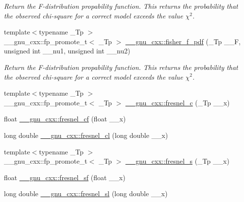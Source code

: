 \begin{DoxyCompactItemize}
\begin{DoxyCompactList}\small\item\em Return the F-\/distribution propability function. This returns the probability that the observed chi-\/square for a correct model exceeds the value $ \chi^2 $. \end{DoxyCompactList}\item 
{\footnotesize template$<$typename \+\_\+\+Tp $>$ }\\\+\_\+\+\_\+gnu\+\_\+cxx\+::fp\+\_\+promote\+\_\+t$<$ \+\_\+\+Tp $>$ \hyperlink{group__gnu__math__spec__func_gac4564fd8e265c000675e0f38d656a18a}{\+\_\+\+\_\+gnu\+\_\+cxx\+::fisher\+\_\+f\+\_\+pdf} (\+\_\+\+Tp \+\_\+\+\_\+F, unsigned int \+\_\+\+\_\+nu1, unsigned int \+\_\+\+\_\+nu2)
\begin{DoxyCompactList}\small\item\em Return the F-\/distribution propability function. This returns the probability that the observed chi-\/square for a correct model exceeds the value $ \chi^2 $. \end{DoxyCompactList}\item 
{\footnotesize template$<$typename \+\_\+\+Tp $>$ }\\\+\_\+\+\_\+gnu\+\_\+cxx\+::fp\+\_\+promote\+\_\+t$<$ \+\_\+\+Tp $>$ \hyperlink{group__gnu__math__spec__func_ga92a3585165bfad3f9972fb4210140d22}{\+\_\+\+\_\+gnu\+\_\+cxx\+::fresnel\+\_\+c} (\+\_\+\+Tp \+\_\+\+\_\+x)
\item 
float \hyperlink{group__gnu__math__spec__func_ga02ca7579d5aef96cba69e38e988e7a42}{\+\_\+\+\_\+gnu\+\_\+cxx\+::fresnel\+\_\+cf} (float \+\_\+\+\_\+x)
\item 
long double \hyperlink{group__gnu__math__spec__func_gaa3f82a7569d61c2f7c194d2e64b616f8}{\+\_\+\+\_\+gnu\+\_\+cxx\+::fresnel\+\_\+cl} (long double \+\_\+\+\_\+x)
\item 
{\footnotesize template$<$typename \+\_\+\+Tp $>$ }\\\+\_\+\+\_\+gnu\+\_\+cxx\+::fp\+\_\+promote\+\_\+t$<$ \+\_\+\+Tp $>$ \hyperlink{group__gnu__math__spec__func_ga075a32b4f59a5fa67c2e28232c89ad45}{\+\_\+\+\_\+gnu\+\_\+cxx\+::fresnel\+\_\+s} (\+\_\+\+Tp \+\_\+\+\_\+x)
\item 
float \hyperlink{group__gnu__math__spec__func_ga73450b8fd4abd5d8d3191dd6cbcda808}{\+\_\+\+\_\+gnu\+\_\+cxx\+::fresnel\+\_\+sf} (float \+\_\+\+\_\+x)
\item 
long double \hyperlink{group__gnu__math__spec__func_ga5d6ac976fa316df9b943f92bafe1407d}{\+\_\+\+\_\+gnu\+\_\+cxx\+::fresnel\+\_\+sl} (long double \+\_\+\+\_\+x)

\end{DoxyCompactItemize}
